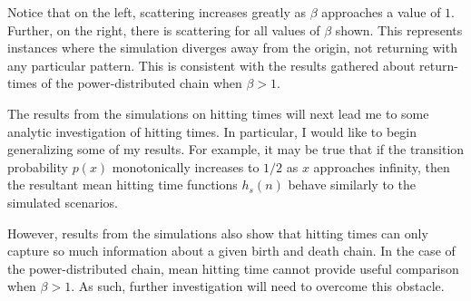Notice that on the left, scattering increases greatly as $\beta$ approaches a value of $1$. Further, on
the right, there is scattering for all values of $\beta$ shown. This represents instances where the
simulation diverges away from the origin, not returning with any particular pattern. This is consistent
with the results gathered about return-times of the power-distributed chain when $\beta > 1$.

The results from the simulations on hitting times will next lead me to some analytic investigation of
hitting times. In particular, I would like to begin generalizing some of my results. For example, it may
be true that if the transition probability $p(x)$ monotonically increases to $1/2$ as $x$ approaches
infinity, then the resultant mean hitting time functions $h_s(n)$ behave similarly to the simulated
scenarios.

However, results from the simulations also show that hitting times can only capture so much information
about a given birth and death chain. In the case of the power-distributed chain, mean hitting time
cannot provide useful comparison when $\beta > 1$. As such, further investigation will need to overcome
this obstacle.
